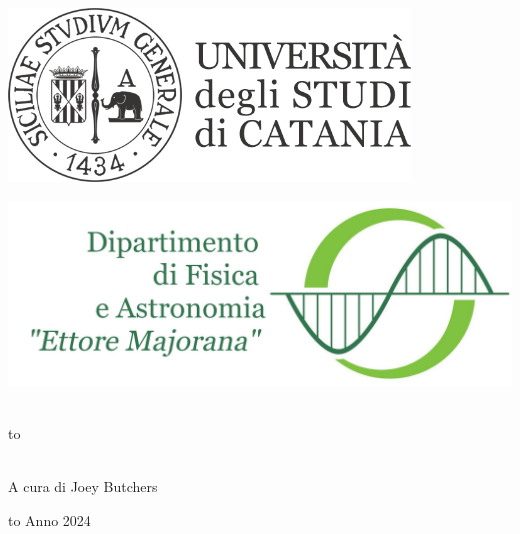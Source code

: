 \documentclass[12pt,openany]{book}
\newcommand\blankpage{%
    \null
    \thispagestyle{empty}%
    \newpage} %
\begin{document}
\thispagestyle{empty}
\begin{center}

\begin{minipage}[c]{0.45\textwidth}
\begin{flushleft}
\includegraphics[width=0.8\textwidth]{logo-unict-orizzontale-grigio.png}
\end{flushleft}
\end{minipage}
\hfill
\begin{minipage}[c]{0.45\textwidth}
\begin{flushright}
\includegraphics[width=\textwidth]{logo_dfa_orizzontale}
\end{flushright}
\end{minipage}\\
\medskip
\hbox to \textwidth{\hrulefill}

\vfill
\vfill

\uppercase{}\\

\vfill
\large{A cura di Joey Butchers}

\vfill
\vfill
\hbox to \textwidth{\hrulefill}
{\sc Anno 2024}
\end{center}

\afterpage{\blankpage}
\newpage

\clearpage                       %
{                                %
  \pagestyle{empty}              %
  {
    \fancyhf{}%
    \renewcommand{\headrulewidth}{0pt}%
    \renewcommand{\footrulewidth}{0pt}%
  }
  \tableofcontents
  \thispagestyle{empty}          %
} %
\end{document}
